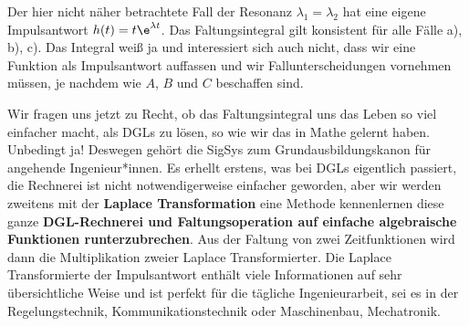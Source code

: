 Der hier nicht näher betrachtete Fall der Resonanz $\lambda_1 = \lambda_2$
hat eine eigene Impulsantwort $h(t) = t \e^{\lambda t}$.
%
Das Faltungsintegral gilt konsistent
für alle Fälle a), b), c). Das Integral weiß ja und interessiert sich auch nicht,
dass wir eine Funktion als Impulsantwort auffassen und wir Fallunterscheidungen
vornehmen müssen, je nachdem wie $A$, $B$ und $C$ beschaffen sind.

Wir fragen uns jetzt zu Recht, ob das Faltungsintegral
uns das Leben so viel einfacher macht, als DGLs zu lösen, so wie wir das in Mathe
gelernt haben.
%
Unbedingt ja! Deswegen gehört die SigSys zum Grundausbildungskanon für angehende
Ingenieur*innen.
Es erhellt erstens, was bei DGLs eigentlich passiert, die Rechnerei
ist nicht notwendigerweise einfacher geworden, aber wir werden zweitens mit der
\textbf{Laplace Transformation} eine
Methode kennenlernen diese ganze \textbf{DGL-Rechnerei und Faltungsoperation auf
einfache algebraische Funktionen runterzubrechen}. Aus der Faltung von zwei
Zeitfunktionen wird dann die Multiplikation zweier Laplace Transformierter.
%
Die Laplace Transformierte der Impulsantwort enthält viele Informationen auf
sehr übersichtliche Weise und ist perfekt für die tägliche Ingenieurarbeit, sei
es in der Regelungstechnik, Kommunikationstechnik oder Maschinenbau, Mechatronik.


